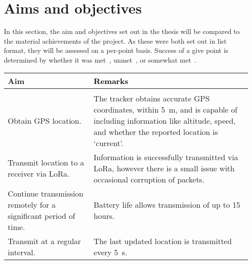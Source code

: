 \documentclass[11pt]{article}
\begin{document}
\onehalfspacing

\section{Aims and objectives}

In this section, the aim and objectives set out in the thesis will be compared 
to the material achievements of the project. As these were both set out in list format,
they will be assessed on a per-point basis. 
Success of a give point is
determined by whether it was met \,, 
unmet \,, 
or somewhat met \,. 

{\small
\begin{xltabular}{\linewidth}{|>{\raggedright\arraybackslash}p{4cm}|>{\color{white}}Z|}
    
    \hline
    Aim & \textcolor{black}{Remarks} \\
    \hline
    \endhead
    \endfoot

     \\
    \hline
    Obtain GPS location. & The tracker obtains accurate GPS coordinates, within \qty{5}{\m}, 
        and is capable of including information like altitude, speed, and whether the reported location is `current'. \\ \hline
    Transmit location to a receiver via LoRa. & Information is successfully transmitted via LoRa,
        however there is a small issue with occasional corruption of packets. \\ \hline    
    Continue transmission remotely for a significant period of time. & Battery life allows transmission of up to 15 hours. \\ \hline    
    Transmit at a regular interval. & The last updated location is  transmitted every \qty{5}{\s}. \\ \hline    


\end{xltabular}}
\end{document}
